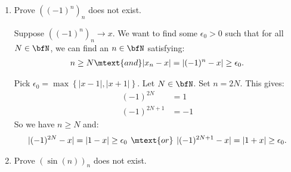     \begin{example}\label{example:sequence-dne}
        \phantom{a}
        \begin{enumerate}[label = (\arabic*)]
            \item Prove $((-1)^n)_n$ does not exist.
                \begin{solution}
                    Suppose  $((-1)^n)_n \rightarrow x$. We want to find some $\epsilon_0 > 0$ such that for all $N \in \bfN$, we can find an $n \in \bfN$ satisfying:
                        \begin{equation*}
                        \begin{split}
                            n \geq N \mtext{and} |x_n - x| = |(-1)^n - x| \geq \epsilon_0.
                        \end{split}
                        \end{equation*}
                \end{solution}
                Pick $\epsilon_0 = \max\left\{|x-1|,|x+1|\right\}$. Let $N \in \bfN$. Set $n = 2N$. This gives:
                    \begin{equation*}
                    \begin{split}
                        (-1)^{2N} &= 1 \\
                        (-1)^{2N+1} &= -1
                    \end{split}
                    \end{equation*}
                So we have $n \geq N$ and: 
                    \begin{equation*}
                    \begin{split}
                        |(-1)^{2N} - x| = |1 - x| \geq \epsilon_0 \hspace{4pt}\mtext{or}\hspace{4pt} |(-1)^{2N+1} - x| = |1+x| \geq \epsilon_0.
                    \end{split}
                    \end{equation*}

            \item Prove $(\sin(n))_n$ does not exist.
                {\color{red} \begin{solution}
                    
                \end{solution}}
        \end{enumerate}
    \end{example}

